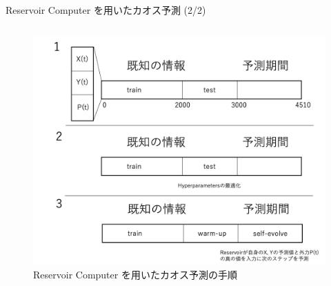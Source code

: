 \begin{frame}{Reservoir Computer を用いたカオス予測 (2/2)}
\begin{columns}[T]
    \begin{column}{.5\textwidth}
    \begin{figure}
        \includegraphics[width=\textwidth]{Fig/please.png}
        \caption{\scriptsize{Reservoir Computer を用いたカオス予測の手順}}
    \end{figure}   
    \end{column}
\end{columns}
\end{frame}
